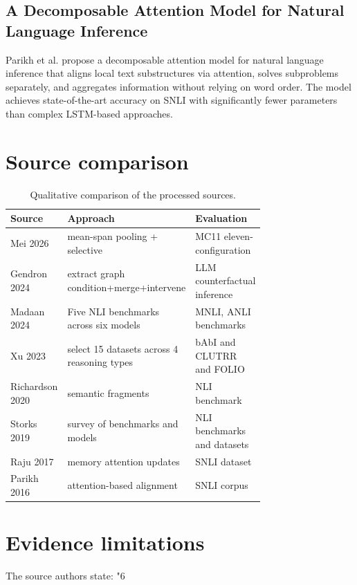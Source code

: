 \documentclass[runningheads]{llncs}
\begin{document}
\subsection{A Decomposable Attention Model for Natural Language Inference}
Parikh et al. propose a decomposable attention model for natural language inference that aligns local text substructures via attention, solves subproblems separately, and aggregates information without relying on word order. The model achieves state-of-the-art accuracy on SNLI with significantly fewer parameters than complex LSTM-based approaches. \cite{parikh2016decomposable}

\section{Source comparison}
\begin{table}[H]\centering
\caption{Qualitative comparison of the processed sources.}
\begin{tabular}{|>{\raggedright\arraybackslash}p{0.26\linewidth}|>{\raggedright\arraybackslash}p{0.235\linewidth}|>{\raggedright\arraybackslash}p{0.235\linewidth}|}\hline
Source & Approach & Evaluation \\ \hline
Mei 2026 \cite{mei2026improving} & mean-span pooling + selective & MC11 eleven-configuration \\ \hline
Gendron 2024 \cite{gendron2024counterfactual} & extract graph condition+merge+intervene & LLM counterfactual inference \\ \hline
Madaan 2024 \cite{madaan2024lost} & Five NLI benchmarks across six models & MNLI, ANLI benchmarks \\ \hline
Xu 2023 \cite{xu2023large} & select 15 datasets across 4 reasoning types & bAbI and CLUTRR and FOLIO \\ \hline
Richardson 2020 \cite{richardson2020probing} & semantic fragments & NLI benchmark \\ \hline
Storks 2019 \cite{storks2019recent} & survey of benchmarks and models & NLI benchmarks and datasets \\ \hline
Raju 2017 \cite{raju2017dynamic} & memory attention updates & SNLI dataset \\ \hline
Parikh 2016 \cite{parikh2016decomposable} & attention-based alignment & SNLI corpus \\ \hline
\end{tabular}\end{table}
\section{Evidence limitations}
The source authors state: "6
\end{document}
